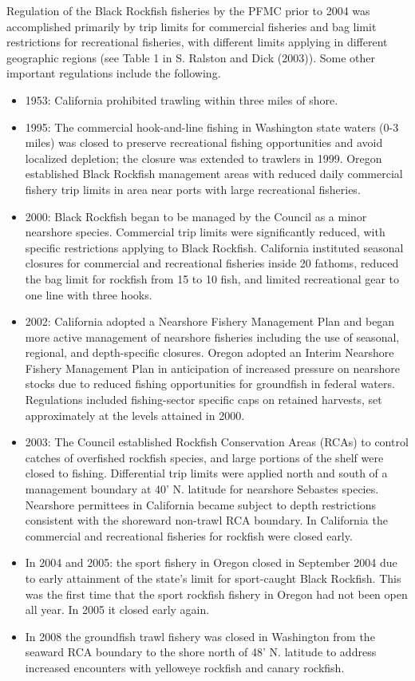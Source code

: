 \documentclass[11pt,
  english,
  letterpaper,
]{article}
\providecommand{\tightlist}{%
  \setlength{\itemsep}{0pt}\setlength{\parskip}{0pt}}
\providecommand{\tightlist}{%
  \setlength{\itemsep}{0pt}\setlength{\parskip}{0pt}}
\begin{document}
Regulation of the Black Rockfish fisheries by the PFMC prior to 2004 was accomplished primarily by trip limits for commercial fisheries and bag limit restrictions for recreational fisheries, with different limits applying in different geographic regions (see Table 1 in S. Ralston and Dick (2003)). Some other important regulations include the following.

\begin{itemize}
\tightlist
\item
  1953: California prohibited trawling within three miles of shore.
\item
  1995: The commercial hook-and-line fishing in Washington state waters (0-3 miles) was closed to preserve recreational fishing opportunities and avoid localized depletion; the closure was extended to trawlers in 1999. Oregon established Black Rockfish management areas with reduced daily commercial fishery trip limits in area near ports with large recreational fisheries.
\item
  2000: Black Rockfish began to be managed by the Council as a minor nearshore species. Commercial trip limits were significantly reduced, with specific restrictions applying to Black Rockfish. California instituted seasonal closures for commercial and recreational fisheries inside 20 fathoms, reduced the bag limit for rockfish from 15 to 10 fish, and limited recreational gear to one line with three hooks.
\item
  2002: California adopted a Nearshore Fishery Management Plan and began more active management of nearshore fisheries including the use of seasonal, regional, and depth-specific closures. Oregon adopted an Interim Nearshore Fishery Management Plan in anticipation of increased pressure on nearshore stocks due to reduced fishing opportunities for groundfish in federal waters. Regulations included fishing-sector specific caps on retained harvests, set approximately at the levels attained in 2000.
\item
  2003: The Council established Rockfish Conservation Areas (RCAs) to control catches of overfished rockfish species, and large portions of the shelf were closed to fishing. Differential trip limits were applied north and south of a management boundary at 40' N. latitude for nearshore Sebastes species. Nearshore permittees in California became subject to depth restrictions consistent with the shoreward non-trawl RCA boundary. In California the commercial and recreational fisheries for rockfish were closed early.
\item
  In 2004 and 2005: the sport fishery in Oregon closed in September 2004 due to early attainment of the state's limit for sport-caught Black Rockfish. This was the first time that the sport rockfish fishery in Oregon had not been open all year. In 2005 it closed early again.
\item
  In 2008 the groundfish trawl fishery was closed in Washington from the seaward RCA boundary to the shore north of 48' N. latitude to address increased encounters with yelloweye rockfish and canary rockfish.
\end{itemize}
\end{document}

